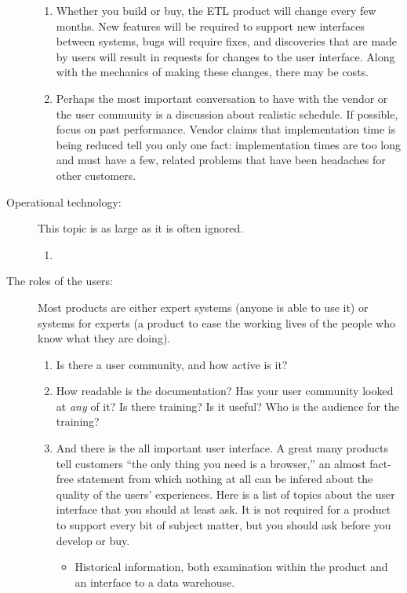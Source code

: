 \documentclass[11pt,letterpaper,twosided]{memoir}
\begin{document}
\begin{description}
\begin{enumerate}
\item Whether you build or buy, the ETL product will change every
few months. New features will be required to support new interfaces
between systems, bugs will require fixes, and discoveries that are
made by users will result in requests for changes to the user
interface. Along with the mechanics of making these changes,
there may be costs.

\item Perhaps the most important conversation to have with the
vendor or the user community is a discussion about realistic
schedule. If possible, focus on past performance. Vendor claims
that implementation time is being reduced tell you only one
fact: implementation times are too long and must have a 
few, related problems that have been headaches for other 
customers.

\end{enumerate}

\item[Operational technology:] This topic is as large as it is often
ignored.

\begin{enumerate}
\item 
\end{enumerate}

\item[The roles of the users:] Most products are either expert
systems (anyone is able to use it) or systems for experts (a product
to ease the working lives of the people who know what they are
doing).

\begin{enumerate}
\item Is there a user community, and how active is it?

\item How readable is the documentation? Has your user community
looked at \emph{any} of it? Is there training? Is it useful? Who
is the audience for the training?

\item And there is the all important user interface. A great many
products tell customers ``the only thing you need is a browser,''
an almost fact-free statement from which nothing at all can be
infered about the quality of the users' experiences. Here is a list
of topics about the user interface that you should at least ask.
It is not required for a product to support every bit of subject
matter, but you should ask before you develop or buy.

\begin{itemize}
\item Historical information, both examination within the product
and an interface to a data warehouse.


\end{itemize}
\end{enumerate}
\end{description}
\end{document}
